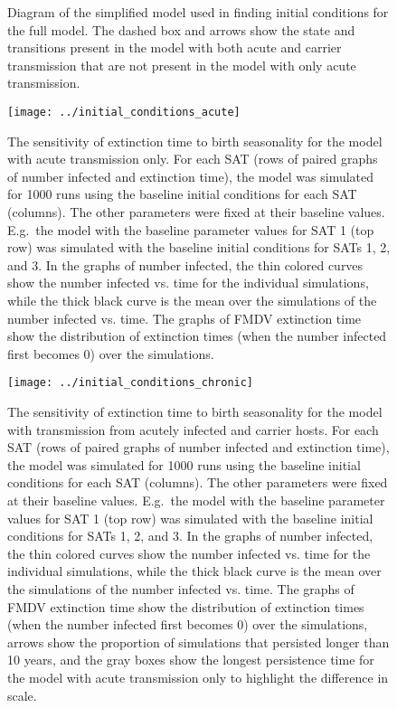 \documentclass[12pt, USenglish]{article}  %
\begin{document}
\begin{figure}
  \centering
  \textsf{}
  \caption{Diagram of the simplified model used in finding initial
    conditions for the full model. The dashed box and arrows show the
    state and transitions present in the model with both acute and
    carrier transmission that are not present in the model with only
    acute transmission.}
\end{figure}

\begin{figure}
  \centering
  \texttt{[image: ../initial\_conditions\_acute]}
  \caption{The sensitivity of extinction time to birth seasonality for
    the model with acute transmission only.
    For each SAT (rows of paired graphs of number infected and
    extinction time), the model was simulated for 1000 runs using the
    baseline initial conditions for each SAT (columns).
    The other parameters were fixed at their baseline values.
    E.g.~the model with the baseline parameter values for SAT 1 (top
    row) was simulated with the baseline initial conditions for SATs
    1, 2, and 3.
    In the graphs of number infected, the thin colored curves show the
    number infected vs. time for the individual simulations, while the
    thick black curve is the mean over the simulations of the number
    infected vs. time.
    The graphs of FMDV extinction time show the distribution of
    extinction times (when the number infected first becomes 0) over
    the simulations.}
  \label{fig:initial_conditions_acute}
\end{figure}

\begin{figure}
  \centering
  \texttt{[image: ../initial\_conditions\_chronic]}
  \caption{The sensitivity of extinction time to birth seasonality for
    the model with transmission from acutely infected and carrier hosts.
    For each SAT (rows of paired graphs of number infected and
    extinction time), the model was simulated for 1000 runs using the
    baseline initial conditions for each SAT (columns).
    The other parameters were fixed at their baseline values.
    E.g.~the model with the baseline parameter values for SAT 1 (top
    row) was simulated with the baseline initial conditions for SATs
    1, 2, and 3.
    In the graphs of number infected, the thin colored curves show the
    number infected vs. time for the individual simulations, while the
    thick black curve is the mean over the simulations of the number
    infected vs. time.
    The graphs of FMDV extinction time show the distribution of
    extinction times (when the number infected first becomes 0) over
    the simulations, arrows show the
    proportion of simulations that persisted longer than 10 years,
    and the gray boxes show the longest persistence time for the
    model with acute transmission only to highlight the difference in
    scale.}
\end{figure}
\end{document}
